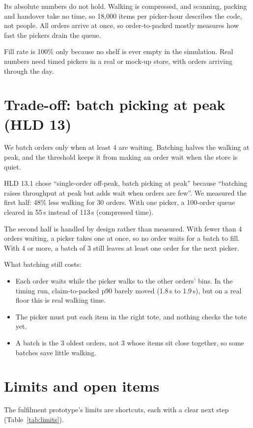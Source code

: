 Its absolute numbers do not hold. Walking is compressed, and scanning, packing and handover take no time, so 18,000
items per picker-hour describes the code, not people. All orders arrive at once, so order-to-packed mostly measures how
fast the pickers drain the queue.

Fill rate is 100\% only because no shelf is ever empty in the simulation. Real numbers need timed pickers in a real or
mock-up store, with orders arriving through the day.

\section{Trade-off: batch picking at peak (HLD 13)}

We batch orders only when at least 4 are waiting. Batching halves the walking at peak, and the threshold keeps it from
making an order wait when the store is quiet.

HLD 13.1 chose ``single-order off-peak, batch picking at peak'' because ``batching raises throughput at peak but adds
wait when orders are few''. We measured the first half: 48\% less walking for 30 orders. With one picker, a 100-order
queue cleared in 55\,s instead of 113\,s (compressed time).

The second half is handled by design rather than measured. With fewer than 4 orders waiting, a picker takes one at
once, so no order waits for a batch to fill. With 4 or more, a batch of 3 still leaves at least one order for the next
picker.

What batching still costs:
\begin{itemize}
  \item Each order waits while the picker walks to the other orders' bins. In the timing run, claim-to-packed p90
    barely moved (1.8\,s to 1.9\,s), but on a real floor this is real walking time.
  \item The picker must put each item in the right tote, and nothing checks the tote yet.
  \item A batch is the 3 oldest orders, not 3 whose items sit close together, so some batches save little walking.
\end{itemize}

\section{Limits and open items}

The fulfilment prototype's limits are shortcuts, each with a clear next step (Table~\ref{tab:limits}).

